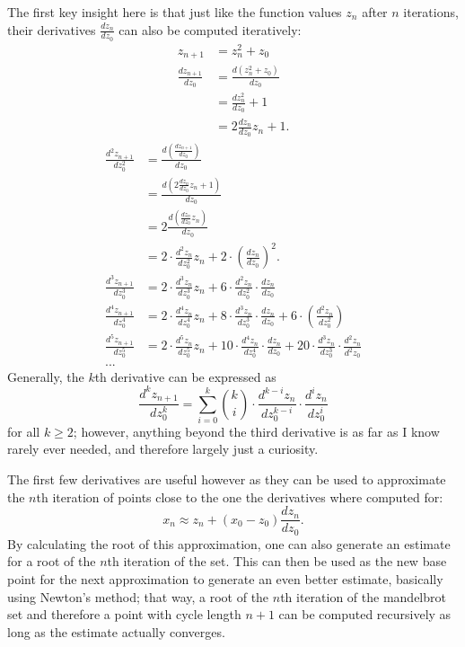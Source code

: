 \documentclass[12pt,a4paper]{article}
\begin{document}
The first key insight here is that just like the function values $z_n$ after $n$ iterations, their derivatives $\frac{dz_n}{dz_0}$ can also be computed iteratively:
\begin{align*}
	z_{n+1} &= z_n^2+z_0\\
	\frac{dz_{n+1}}{dz_0} &= \frac{d(z_n^2+z_0)}{dz_0}\\
	&= \frac{dz_n^2}{dz_0}+1\\
	&= 2\frac{dz_n}{dz_0}z_n+1.
\end{align*}
\begin{align*}
	\frac{d^2z_{n+1}}{dz_0^2} &= \frac{d(\frac{dz_{n+1}}{dz_0})}{dz_0}\\
	&= \frac{d(2\frac{dz_n}{dz_0}z_n+1)}{dz_0}\\
	&= 2\frac{d(\frac{dz_n}{dz_0}z_n)}{dz_0}\\
	&= 2\cdot\frac{d^2z_n}{dz_0^2}z_n+2\cdot(\frac{dz_n}{dz_0})^2.\\
	\frac{d^3z_{n+1}}{dz_0^3} &= 2\cdot\frac{d^3z_n}{dz_0^3}z_n+6\cdot\frac{d^2z_n}{dz_0^2}\cdot\frac{dz_n}{dz_0}\\
	\frac{d^4z_{n+1}}{dz_0^4} &= 2\cdot\frac{d^4z_n}{dz_0^4}z_n+8\cdot\frac{d^3z_n}{dz_0^3}\cdot\frac{dz_n}{dz_0}+6\cdot(\frac{d^2z_n}{dz_0^2})\\
	\frac{d^5z_{n+1}}{dz_0^5} &= 2\cdot\frac{d^5z_n}{dz_0^5}z_n+10\cdot\frac{d^4z_n}{dz_0^4}\cdot\frac{dz_n}{dz_0}+20\cdot\frac{d^3z_n}{dz_0^3}\cdot\frac{d^2z_n}{d^2z_0}\\
	...
\end{align*}
Generally, the $k$th derivative can be expressed as
$$\frac{d^kz_{n+1}}{dz_0^k} = \sum_{i=0}^{k}\binom{k}{i}\cdot\frac{d^{k-i}z_n}{dz_0^{k-i}}\cdot\frac{d^iz_n}{dz_0^i}$$
for all $k\geq2$; however, anything beyond the third derivative is as far as I know rarely ever needed, and therefore largely just a curiosity.

The first few derivatives are useful however as they can be used to approximate the $n$th iteration of points close to the one the derivatives where computed for:
$$x_n \approx z_n+(x_0-z_0)\frac{dz_n}{dz_0}.$$
By calculating the root of this approximation, one can also generate an estimate for a root of the $n$th iteration of the set. This can then be used as the new base point for the next approximation to generate an even better estimate, basically using Newton's method; that way, a root of the $n$th iteration of the mandelbrot set and therefore a point with cycle length $n+1$ can be computed recursively as long as the estimate actually converges.
\end{document}
